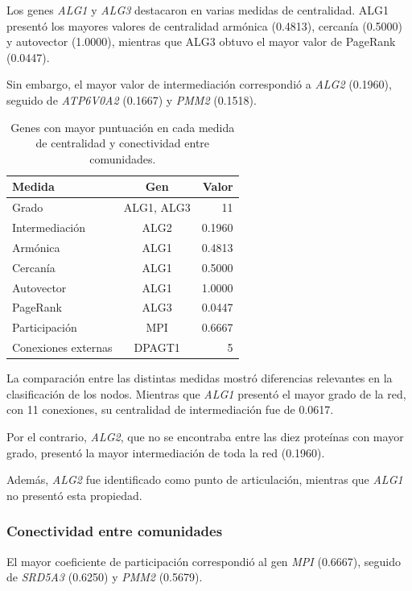 Los genes \textit{ALG1} y \textit{ALG3} destacaron
en varias medidas de centralidad. ALG1 presentó los
mayores valores de centralidad armónica (0.4813),
cercanía (0.5000) y autovector (1.0000), mientras
que ALG3 obtuvo el mayor valor de PageRank (0.0447).

Sin embargo, el mayor valor de intermediación
correspondió a \textit{ALG2} (0.1960), seguido
de \textit{ATP6V0A2} (0.1667) y \textit{PMM2}
(0.1518).

\begin{table}[htbp]
\centering
\caption{Genes con mayor puntuación en cada medida
de centralidad y conectividad entre comunidades.}
\label{tab:centralidades_maximas}
\begin{tabular}{lcr}
\hline
Medida & Gen & Valor \\
\hline
Grado & ALG1, ALG3 & 11 \\
Intermediación & ALG2 & 0.1960 \\
Armónica & ALG1 & 0.4813 \\
Cercanía & ALG1 & 0.5000 \\
Autovector & ALG1 & 1.0000 \\
PageRank & ALG3 & 0.0447 \\
Participación & MPI & 0.6667 \\
Conexiones externas & DPAGT1 & 5 \\
\hline
\end{tabular}
\end{table}


La comparación entre las distintas medidas mostró
diferencias relevantes en la clasificación de los
nodos. Mientras que \textit{ALG1} presentó el mayor
grado de la red, con 11 conexiones, su centralidad
de intermediación fue de 0.0617.

Por el contrario, \textit{ALG2}, que no se encontraba
entre las diez proteínas con mayor grado, presentó
la mayor intermediación de toda la red (0.1960).

Además, \textit{ALG2} fue identificado como punto
de articulación, mientras que \textit{ALG1} no
presentó esta propiedad.



\subsubsection{Conectividad entre comunidades}

El mayor coeficiente de participación correspondió
al gen \textit{MPI} (0.6667), seguido de
\textit{SRD5A3} (0.6250) y \textit{PMM2} (0.5679).

